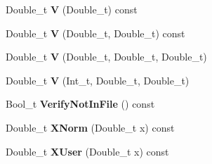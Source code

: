 \begin{DoxyCompactItemize}
\item 
\hypertarget{classTSplineFit_aeae9e7a0544dc3af229ec3d85ae6ea06}{Double\-\_\-t {\bfseries V} (Double\-\_\-t) const }\label{classTSplineFit_aeae9e7a0544dc3af229ec3d85ae6ea06}

\item 
\hypertarget{classTSplineFit_a5bfaf83c15e5662ab2667b3f54d8cd52}{Double\-\_\-t {\bfseries V} (Double\-\_\-t, Double\-\_\-t) const }\label{classTSplineFit_a5bfaf83c15e5662ab2667b3f54d8cd52}

\item 
\hypertarget{classTSplineFit_af6319691cca0b7b3737aef24c92efe4c}{Double\-\_\-t {\bfseries V} (Double\-\_\-t, Double\-\_\-t, Double\-\_\-t)}\label{classTSplineFit_af6319691cca0b7b3737aef24c92efe4c}

\item 
\hypertarget{classTSplineFit_a2a1bc8da1244692719c977772f29957b}{Double\-\_\-t {\bfseries V} (Int\-\_\-t, Double\-\_\-t, Double\-\_\-t)}\label{classTSplineFit_a2a1bc8da1244692719c977772f29957b}

\item 
\hypertarget{classTSplineFit_a5ab97d3eb7776c27e056886c61f97fa3}{Bool\-\_\-t {\bfseries Verify\-Not\-In\-File} () const }\label{classTSplineFit_a5ab97d3eb7776c27e056886c61f97fa3}

\item 
\hypertarget{classTSplineFit_ae959ec8a8de40a9f48cf09d2843b910a}{Double\-\_\-t {\bfseries X\-Norm} (Double\-\_\-t x) const }\label{classTSplineFit_ae959ec8a8de40a9f48cf09d2843b910a}

\item 
\hypertarget{classTSplineFit_a988ff895ea488dc27ba41f8363243b53}{Double\-\_\-t {\bfseries X\-User} (Double\-\_\-t x) const }\label{classTSplineFit_a988ff895ea488dc27ba41f8363243b53}

\end{DoxyCompactItemize}
